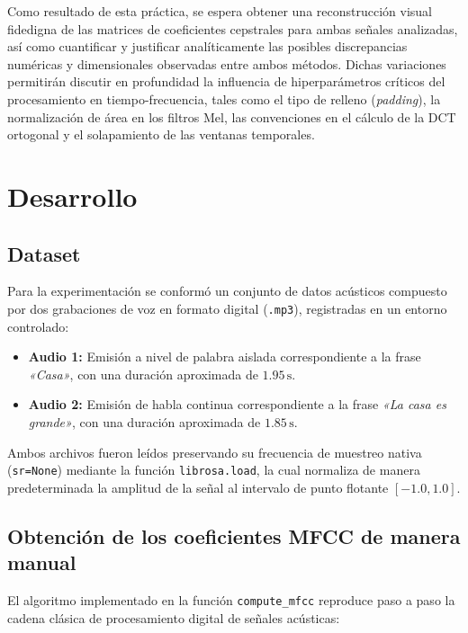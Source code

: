 \documentclass[12pt]{article}
\begin{document}
	Como resultado de esta práctica, se espera obtener una reconstrucción visual fidedigna de las matrices de coeficientes cepstrales para ambas señales analizadas, así como cuantificar y justificar analíticamente las posibles discrepancias numéricas y dimensionales observadas entre ambos métodos. Dichas variaciones permitirán discutir en profundidad la influencia de hiperparámetros críticos del procesamiento en tiempo-frecuencia, tales como el tipo de relleno (\textit{padding}), la normalización de área en los filtros Mel, las convenciones en el cálculo de la DCT ortogonal y el solapamiento de las ventanas temporales.
	
\section{Desarrollo}

\subsection{Dataset}
Para la experimentación se conformó un conjunto de datos acústicos compuesto por dos grabaciones de voz en formato digital (\texttt{.mp3}), registradas en un entorno controlado:
\begin{itemize}
	\item \textbf{Audio 1:} Emisión a nivel de palabra aislada correspondiente a la frase \textit{«Casa»}, con una duración aproximada de $1.95\,\text{s}$.
	\item \textbf{Audio 2:} Emisión de habla continua correspondiente a la frase \textit{«La casa es grande»}, con una duración aproximada de $1.85\,\text{s}$.
\end{itemize}
Ambos archivos fueron leídos preservando su frecuencia de muestreo nativa (\texttt{sr=None}) mediante la función \texttt{librosa.load}, la cual normaliza de manera predeterminada la amplitud de la señal al intervalo de punto flotante $[-1.0, 1.0]$.

\subsection{Obtención de los coeficientes MFCC de manera manual}
El algoritmo implementado en la función \texttt{compute\_mfcc} reproduce paso a paso la cadena clásica de procesamiento digital de señales acústicas:
\end{document}
